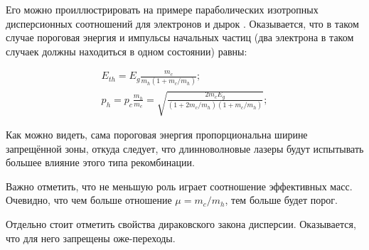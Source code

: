 \documentclass[../main.tex]{subfiles}
\begin{document}
    Его можно проиллюстрировать на примере параболических изотропных дисперсионных 
    соотношений для электронов и дырок \cite{AbakumovYassievich1997}. Оказывается,
    что в таком случае пороговая энергия и импульсы начальных частиц (два электрона
    в таком случаек должны находиться в одном состоянии) равны:

        \begin{equation}
            \begin{array}{l}
                E_{th} = E_g \frac{m_c}{m_h ( 1 + m_c / m_h)};\\
                p_{h} = p_{c} \frac{m_h}{m_c} = \sqrt{\frac{2m_c E_g}{(1+ 2m_c/m_h)(1+ m_c / m_h)}};
            \end{array}
        \end{equation}

    Как можно видеть, сама пороговая энергия пропорциональна ширине запрещённой зоны,
    откуда следует, что длинноволновые  лазеры будут испытывать большее влияние этого 
    типа рекомбинации.

    Важно отметить, что не меньшую роль играет соотношение эффективных
    масс. Очевидно, что чем больше отношение $\mu = m_c / m_h$, тем больше будет порог.

    Отдельно стоит отметить свойства дираковского закона дисперсии. Оказывается, что 
    для него запрещены оже-переходы.
\end{document}
